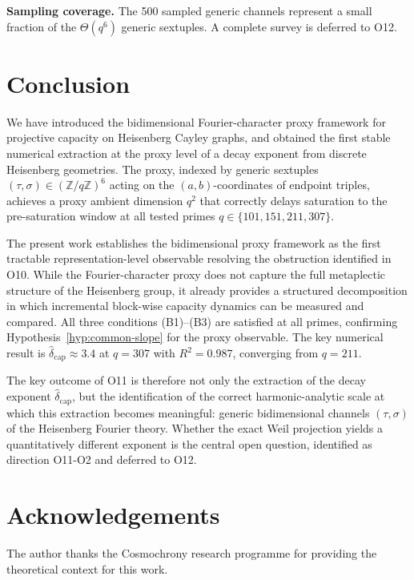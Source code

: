 \documentclass[11pt,a4paper]{article}
\newcommand{\dcap}{\delta_{\mathrm{cap}}}
\begin{document}
    \textbf{Sampling coverage.}
    The 500 sampled generic channels represent a small fraction of the $\Theta(q^6)$ generic
    sextuples.
    A complete survey is deferred to O12.

  \section{Conclusion}
  \label{sec:conclusion}

  We have introduced the bidimensional Fourier-character proxy framework for projective
  capacity on Heisenberg Cayley graphs, and obtained the first stable numerical extraction at the proxy level of
  a decay exponent from discrete Heisenberg geometries.
  The proxy, indexed by generic sextuples $(\tau,\sigma) \in (\mathbb{Z}/q\mathbb{Z})^6$
  acting on the $(a,b)$-coordinates of endpoint triples, achieves a proxy ambient dimension
  $q^2$ that correctly delays saturation to the pre-saturation window at all tested primes
  $q \in \{101, 151, 211, 307\}$.

  The present work establishes the bidimensional proxy framework as the first tractable
  representation-level observable resolving the obstruction identified in O10.
  While the Fourier-character proxy does not capture the full metaplectic structure of the
  Heisenberg group, it already provides a structured decomposition in which incremental
  block-wise capacity dynamics can be measured and compared.
  All three conditions (B1)--(B3) are satisfied at all primes, confirming
  Hypothesis~\ref{hyp:common-slope} for the proxy observable.
  The key numerical result is $\hat\dcap \approx 3.4$ at $q = 307$ with $R^2 = 0.987$,
  converging from $q = 211$.

  The key outcome of O11 is therefore not only the extraction of the decay exponent
  $\hat\dcap$, but the identification of the correct harmonic-analytic scale at which this
  extraction becomes meaningful: generic bidimensional channels $(\tau,\sigma)$ of the
  Heisenberg Fourier theory.
  Whether the exact Weil projection yields a quantitatively different exponent is the central
  open question, identified as direction O11-O2 and deferred to O12.

  \section*{Acknowledgements}

  The author thanks the Cosmochrony research programme for providing the theoretical context
  for this work.

  
      
\end{document}
